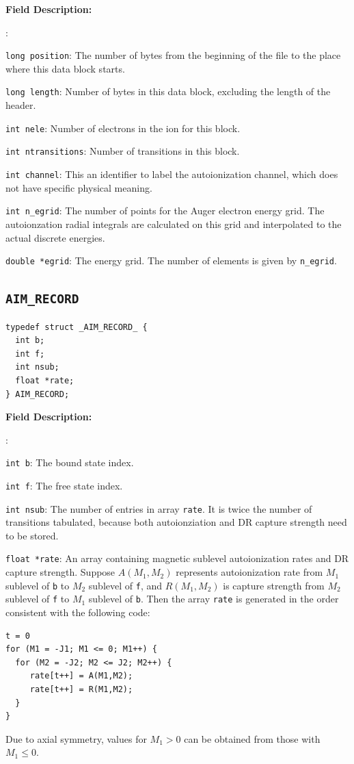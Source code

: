 \documentclass[twoside,letterpaper]{refrep}
\newenvironment{dbdesc}{\textbf{Field Description:} \begin{list}
	{:}{\setlength{\labelwidth}{2in}
	   \setlength{\leftmargin}{2in}
	   \setlength{\labelsep}{0.1in}
	   \setlength{\rightmargin}{0.2in}}}
	{\end{list}}
\begin{document}
\begin{dbdesc}
\item[\texttt{long position}:] The number of bytes from the beginning of the
file to the place where this data block starts.
\item[\texttt{long length}:] Number of bytes in this data block, excluding the
length of the header.
\item[\texttt{int nele}:] Number of electrons in the ion for this block.
\item[\texttt{int ntransitions}:] Number of transitions in this block.
\item[\texttt{int channel}:] This an identifier to label the autoionization
channel, which does not have specific physical meaning.
\item[\texttt{int n\_egrid}:] The number of points for the Auger electron
energy grid. The autoionzation radial integrals are calculated on this grid
and interpolated to the actual discrete energies.
\item[\texttt{double *egrid}:] The energy grid. The number of elements is
given by \texttt{n\_egrid}.
\end{dbdesc}

\subsection{\texttt{AIM\_RECORD}}
\begin{verbatim}
typedef struct _AIM_RECORD_ {
  int b;
  int f;
  int nsub;
  float *rate;
} AIM_RECORD;
\end{verbatim}
\begin{dbdesc}
\item[\texttt{int b}:] The bound state index.
\item[\texttt{int f}:] The free state index.
\item[\texttt{int nsub}:] The number of entries in array \texttt{rate}. It is
twice the number of transitions tabulated, because both autoionziation and DR
capture strength need to be stored. 
\item[\texttt{float *rate}:] An array containing magnetic sublevel
autoionization rates and DR capture strength. Suppose $A(M_1,M_2)$ represents
autoionization rate from $M_1$ sublevel of \texttt{b} to $M_2$ sublevel of
\texttt{f}, and $R(M_1,M_2)$ is capture strength from $M_2$ sublevel of
\texttt{f} to $M_1$ sublevel of \texttt{b}. Then the array \texttt{rate} is
generated in the order consistent with the following code:
\begin{verbatim}
t = 0
for (M1 = -J1; M1 <= 0; M1++) {
  for (M2 = -J2; M2 <= J2; M2++) {
     rate[t++] = A(M1,M2);
     rate[t++] = R(M1,M2);
  }
}
\end{verbatim}
Due to axial symmetry, values for $M_1 > 0$ can be obtained from those with
$M_1 \le 0$.
\end{dbdesc}
\end{document}
